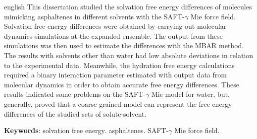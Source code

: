 \documentclass[
	12pt,				%
	openany,			%
	oneside,			%
	a4paper,			%
	english,			%
	brazil				%
	]{abntex2}
\begin{document}
\begin{resumo}[Abstract]
 \begin{otherlanguage*}{english}
  This dissertation studied the solvation free energy differences of molecules mimicking asphaltenes in different solvents with the SAFT-$\gamma$ Mie force field. Solvation free energy differences were obtained by carrying out molecular dynamics simulations at the expanded ensemble. The output from these simulations was then used to estimate the differences with the MBAR method. The results with solvents other than water had low absolute deviations in relation to the experimental data. Meanwhile, the hydration free energy calculations required a binary interaction parameter estimated with output data from molecular dynamics in order to obtain accurate free energy differences. These results indicated some problems on the SAFT-$\gamma$ Mie model for water, but, generally, proved that a coarse grained model can represent the free energy differences of the studied sets of solute-solvent.

   \vspace{\onelineskip}
 
   \noindent 
   \textbf{Keywords}: solvation free energy. asphaltenes. SAFT-$\gamma$ Mie force field.
 \end{otherlanguage*}
\end{resumo}

\listoffigures*
\cleardoublepage

\listoftables*
\cleardoublepage


\tableofcontents*
\cleardoublepage



\end{document}
